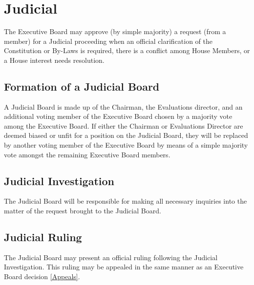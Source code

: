 \documentclass{article}
\newcommand{\article}[1]{\section{#1} \label{#1}}
\newcommand{\asection}[1]{\subsection{#1} \label{#1}}
\begin{document}
\article{Judicial}
The Executive Board may approve (by simple majority) a request (from a member) for a Judicial proceeding when an official clarification of the Constitution or By-Laws is required, there is a conflict among House Members, or a House interest needs resolution.
\asection{Formation of a Judicial Board}
A Judicial Board is made up of the Chairman, the Evaluations director, and an additional voting member of the Executive Board chosen by a majority vote among the Executive Board. If either the Chairman or Evaluations Director are deemed biased or unfit for a position on the Judicial Board,  they will be replaced by another voting member of the Executive Board by means of a simple majority vote amongst the remaining Executive Board members.
\asection{Judicial Investigation}
The Judicial Board will be responsible for making all necessary inquiries into the matter of the request brought to the Judicial Board.
\asection{Judicial Ruling}
The Judicial Board may present an official ruling following the Judicial Investigation. This ruling may be appealed in the same manner as an Executive Board decision \ref{Appeals}.
\end{document}

